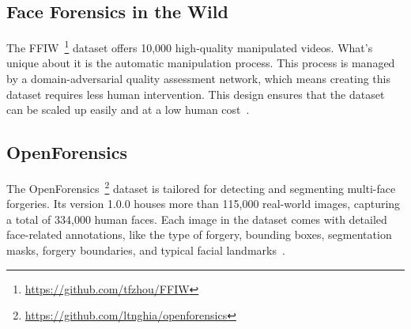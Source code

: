 \subsection{Face Forensics in the Wild}
The \ac{FFIW}~\footnote{\url{https://github.com/tfzhou/FFIW}} dataset offers 10,000 high-quality
manipulated videos. What's unique about it is the automatic manipulation process. This
process is managed by a domain-adversarial quality assessment network, which means creating
this dataset requires less human intervention. This design ensures that the dataset can
be scaled up easily and at a low human cost~\cite{Zhou_2021_CVPR}.

\subsection{OpenForensics}
The OpenForensics~\footnote{\url{https://github.com/ltnghia/openforensics}} dataset is tailored for detecting and segmenting multi-face forgeries.
Its version 1.0.0 houses more than 115,000 real-world images, capturing a total of 334,000 human faces.
Each image in the dataset comes with detailed face-related annotations, like the type
of forgery, bounding boxes, segmentation masks, forgery boundaries, and typical facial
landmarks~\cite{ltnghia-ICCV2021}.


